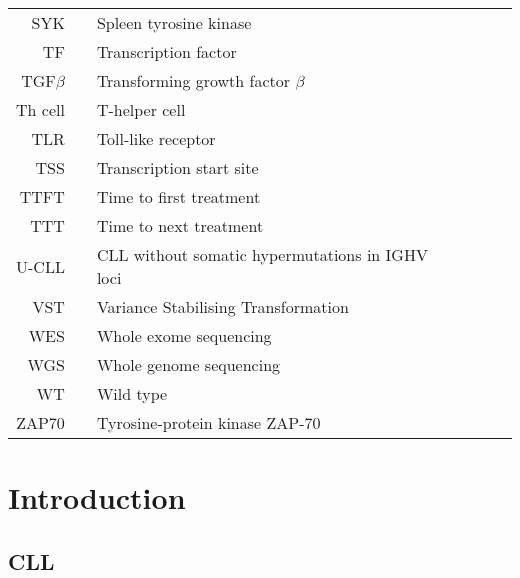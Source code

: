 \documentclass[11pt, a4paper, twosided]{book}
\begin{document}
\begin{tabular}{rp{0.2cm}lp{1cm}rp{0.2cm}l}

  SYK & & Spleen tyrosine kinase \\
    TF & & Transcription factor \\
    TGF$\beta$ & & Transforming growth factor $\beta$ \\
    Th cell & & T-helper cell \\
    TLR & & Toll-like receptor \\ 
    TSS & & Transcription start site \\
    TTFT & & Time to first treatment \\
    TTT & & Time to next treatment \\
    U-CLL & & CLL without somatic hypermutations in IGHV loci \\
    VST & & Variance Stabilising Transformation \\
    WES & & Whole exome sequencing \\
    WGS & & Whole genome sequencing \\
    WT & & Wild type \\
    ZAP70 & & Tyrosine-protein kinase ZAP-70 \\

    
   
\end{tabular}
\newpage
\listoffigures
{}

\newpage
\listoftables
{}

\newpage
\pagestyle{plain} %
\setcounter{page}{1}    %

\hypertarget{introduction}{%
\chapter{Introduction}\label{introduction}}

\hypertarget{cll}{%
\section{CLL}\label{cll}}
\end{document}
